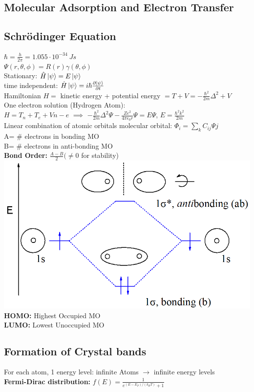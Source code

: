 \documentclass[9pt]{article}
\begin{document}
\begin{multicols}{2}
\section{Molecular Adsorption and Electron Transfer}
\subsection{Schrödinger Equation}
$\hbar = \frac{h}{2\pi}=1.055\cdot 10^{-34}\ Js$\\
$\Psi(r,\theta, \phi)=R(r)\gamma(\theta,\phi)$\\
Stationary: $\hat{H}\ket{\psi}=E\ket{\psi}$\\
	time independent: $\hat{H}\ket{\psi}=i \hbar \frac{\partial \ket{\psi}}{\partial t}$\\
Hamiltonian $H=$ kinetic energy + potential energy $= T+V=-\frac{\hbar ^2}{2m} \Delta ^2+V$\\
One electron solution (Hydrogen Atom):\\
$H=T_n + T_e+V{n-e}$ $\implies$ $-\frac{\hbar ^2}{2m}\Delta ^2 \Psi - \frac{Z e^2}{4 \pi \epsilon_0 r}\Psi=E\Psi$, $E=\frac{\hbar ^2 k^2}{2m}$\\
Linear combination of atomic orbitals molecular orbital: $\Phi _i= \sum_{k} C_{ij} \Psi{j}$\\
A= \# electrons in bonding MO\\
B= \# electrons in anti-bonding MO\\
\textbf{Bond Order: } $\frac{A-B}{2} (\neq 0$ for stability)
\includegraphics[scale=0.1]{Images/bonding_antibonding.png}\\
\textbf{HOMO:} Highest Occupied MO\\
\textbf{LUMO:} Lowest Unoccupied MO\\
\subsection{Formation of Crystal bands}
For each atom, 1 energy level: infinite Atoms $\rightarrow$ infinite energy levels\\
\textbf{Fermi-Dirac distribution: } $f(E)=\frac{1}{e^{(E-E_F)/(k_BT)}+1}$\\

\end{multicols}
\end{document}
